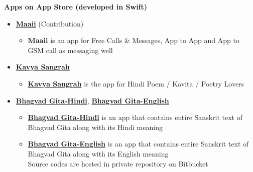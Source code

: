 \documentclass[letterpaper,11pt]{article}
\newcommand{\resitem}[1]{\item #1 \vspace{-2pt}}
\newcommand{\resheading}[1]{{\large \colorbox{mygrey}{\begin{minipage}{\textwidth}{\textbf{#1 \vphantom{p\^{E}}}}\end{minipage}}}}
\begin{document}
\resheading{Apps on App Store  \normalsize \bfseries (developed in Swift)}
\begin{itemize}
\resitem {\href{https://itunes.apple.com/hk/app/id488051175}{\bfseries Maaii} (Contribution)}
		{ \footnotesize
		\begin{itemize}
			\resitem{{\bfseries Maaii} is an app for Free Calls \& Messages, App to App and App to GSM call as messaging well}
		\end{itemize}
		}
\resitem {\href{https://itunes.apple.com/app/id1091530315} {\bfseries Kavya Sangrah}}
		{ \footnotesize
		\begin{itemize}
			\resitem{\href{https://itunes.apple.com/app/id1091530315}{\bfseries Kavya Sangrah} is the app for Hindi Poem / Kavita / Poetry Lovers}
		\end{itemize}
		}
\resitem {{\href{https://itunes.apple.com/app/id1099563171}{\bfseries Bhagvad Gita-Hindi}, \href{https://itunes.apple.com/app/id1099564538}{\bfseries Bhagvad Gita-English}}}
		{ \footnotesize
		\begin{itemize}
			\resitem{\href{https://itunes.apple.com/app/id1099563171}{\bfseries Bhagvad Gita-Hindi} is an app that contains entire Sanskrit text of Bhagvad Gita along with its Hindi meaning}
			\resitem{\href{https://itunes.apple.com/app/id1099564538}{\bfseries Bhagvad Gita-English} is an app that contains entire Sanskrit text of Bhagvad Gita along with its English meaning}\\
			{\tiny *Source codes are hosted in private repository on Bitbucket}
		\end{itemize}
		}
\end{itemize} 
\end{document}
